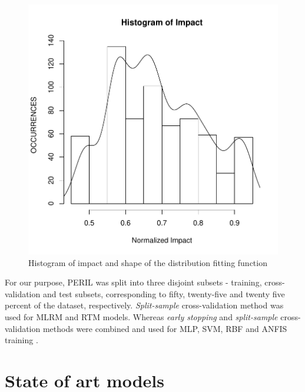 \begin{figure}[h]
  \vspace{-0.2cm}
  \centering
  \includegraphics[width=0.5\columnwidth]{image/impact_histogram.pdf}
  \caption{Histogram of impact and shape of the distribution fitting function}
  \label{fig:impacthistogram}
\end{figure}

For our purpose, PERIL was split into three disjoint subsets - training, cross-validation and test subsets, corresponding to fifty, twenty-five and twenty five percent of the dataset, respectively. \textit{Split-sample} cross-validation method was used for MLRM and RTM models. Whereas \textit{early stopping} and \textit{split-sample} cross-validation methods were combined and used for MLP, SVM, RBF and ANFIS training \cite{priddy2005artificial}.

\section{State of art models}
\label{sec:models}


